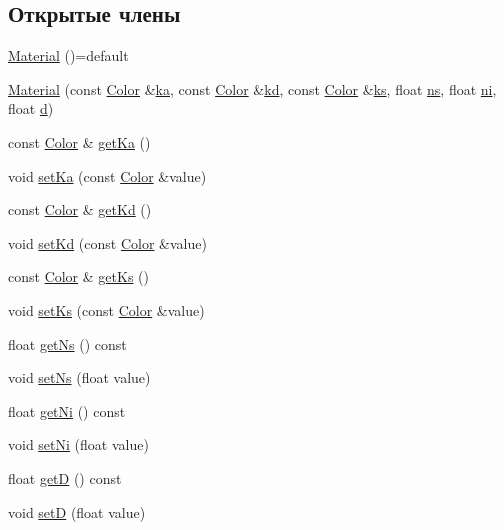 \subsection*{Открытые члены}
\begin{DoxyCompactItemize}
\item 
\hyperlink{class_material_a6059ec72855855b11672ff25962e9336}{Material} ()=default
\item 
\hyperlink{class_material_ac71c087b6f2dcbf130e19e38067a7a5b}{Material} (const \hyperlink{class_color}{Color} \&\hyperlink{class_material_a93cc771f8b2e9d1f273465e25504ea7b}{ka}, const \hyperlink{class_color}{Color} \&\hyperlink{class_material_a42e6838a32f4a6b54a62a01afc4a1cdb}{kd}, const \hyperlink{class_color}{Color} \&\hyperlink{class_material_a986cb019dc23c99fc139b16793c1ddb5}{ks}, float \hyperlink{class_material_a49335919c5596c4523f71be7f01bdf9d}{ns}, float \hyperlink{class_material_a9132d1f6cc468abe6c40659962e06236}{ni}, float \hyperlink{class_material_a72cb289b8dccb7a08e0b0f7880a92803}{d})
\item 
const \hyperlink{class_color}{Color} \& \hyperlink{class_material_a58208d6d0a2debccac4739af6ba61b7b}{get\+Ka} ()
\item 
void \hyperlink{class_material_af4bc3531d699fb7b7a06253d674d0ede}{set\+Ka} (const \hyperlink{class_color}{Color} \&value)
\item 
const \hyperlink{class_color}{Color} \& \hyperlink{class_material_ad89eb0c9b9d729e918a91d7a621afe10}{get\+Kd} ()
\item 
void \hyperlink{class_material_ab31df4f79c03f8863c96dd748b9d2069}{set\+Kd} (const \hyperlink{class_color}{Color} \&value)
\item 
const \hyperlink{class_color}{Color} \& \hyperlink{class_material_ad03edbeaa265fc4aa796904b7f314e86}{get\+Ks} ()
\item 
void \hyperlink{class_material_a0333444c1bfe41998957f56319481f23}{set\+Ks} (const \hyperlink{class_color}{Color} \&value)
\item 
float \hyperlink{class_material_a8843ba8fa8d3e8fb3e04d6a7553408ea}{get\+Ns} () const 
\item 
void \hyperlink{class_material_a46bf0fa68e2bf6da38f360eaecc8bd13}{set\+Ns} (float value)
\item 
float \hyperlink{class_material_afe38fa1be1b3f608ff08414ccc99d539}{get\+Ni} () const 
\item 
void \hyperlink{class_material_a1d41d55723411069d7774c3ae2b33bc8}{set\+Ni} (float value)
\item 
float \hyperlink{class_material_ae8fef701b92d7ca4ddb3761dd2133fec}{getD} () const 
\item 
void \hyperlink{class_material_a7729d3679891dd4394c1468c0a338a01}{setD} (float value)
\end{DoxyCompactItemize}
